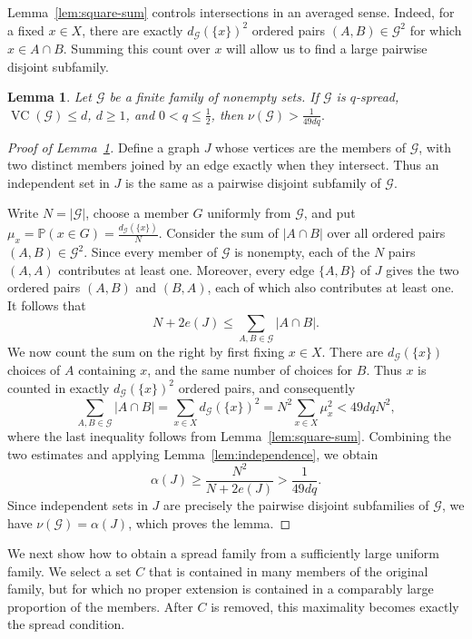 \documentclass[10pt,a4paper]{amsart}
\newtheorem{lemma}[theorem]{Lemma}
\newcommand*{\abs}[1]{\lvert#1\rvert}
\newcommand{\cG}{\mathcal{G}}
\newcommand{\VC}{\operatorname{VC}}
\begin{document}
Lemma~\ref{lem:square-sum} controls intersections in an averaged sense. Indeed, for a fixed \(x\in X\), there are exactly \(d_{\cG}(\{x\})^{2}\) ordered pairs \((A,B)\in\cG^{2}\) for which \(x\in A\cap B\). Summing this count over \(x\) will allow us to find a large pairwise disjoint subfamily.

\begin{lemma}\label{lem:matching}
Let \(\cG\) be a finite family of nonempty sets. If \(\cG\) is \(q\)-spread, \(\VC(\cG)\le d\), \(d\ge 1\), and \(0<q\le\frac{1}{2}\), then
\(
\nu(\cG)>\frac{1}{49dq}.
\)
\end{lemma}

\begin{proof}[Proof of Lemma~\ref{lem:matching}]
Define a graph \(J\) whose vertices are the members of \(\cG\), with two distinct members joined by an edge exactly when they intersect. Thus an independent set in \(J\) is the same as a pairwise disjoint subfamily of \(\cG\).

Write \(N=\abs{\cG}\), choose a member \(G\) uniformly from \(\cG\), and put \(\mu_{x}=\mathbb{P}(x\in G)=\frac{d_{\cG}(\{x\})}{N}\). Consider the sum of \(\abs{A\cap B}\) over all ordered pairs \((A,B)\in\cG^{2}\). Since every member of \(\cG\) is nonempty, each of the \(N\) pairs \((A,A)\) contributes at least one. Moreover, every edge \(\{A,B\}\) of \(J\) gives the two ordered pairs \((A,B)\) and \((B,A)\), each of which also contributes at least one. It follows that
\[
N+2e(J)\le\sum_{A,B\in\cG}\abs{A\cap B}.
\]
We now count the sum on the right by first fixing \(x\in X\). There are \(d_{\cG}(\{x\})\) choices of \(A\) containing \(x\), and the same number of choices for \(B\). Thus \(x\) is counted in exactly \(d_{\cG}(\{x\})^{2}\) ordered pairs, and consequently
\begin{equation*}
\sum_{A,B\in\cG}\abs{A\cap B}
=\sum_{x\in X}d_{\cG}(\{x\})^{2}
=N^{2}\sum_{x\in X}\mu_{x}^{2}
<49dqN^{2},
\end{equation*}
where the last inequality follows from Lemma~\ref{lem:square-sum}. Combining the two estimates and applying Lemma~\ref{lem:independence}, we obtain
\[
\alpha(J)\ge\frac{N^{2}}{N+2e(J)}>\frac{1}{49dq}.
\]
Since independent sets in \(J\) are precisely the pairwise disjoint subfamilies of \(\cG\), we have \(\nu(\cG)=\alpha(J)\), which proves the lemma.
\end{proof}

We next show how to obtain a spread family from a sufficiently large uniform family. We select a set \(C\) that is contained in many members of the original family, but for which no proper extension is contained in a comparably large proportion of the members. After \(C\) is removed, this maximality becomes exactly the spread condition.
\end{document}
